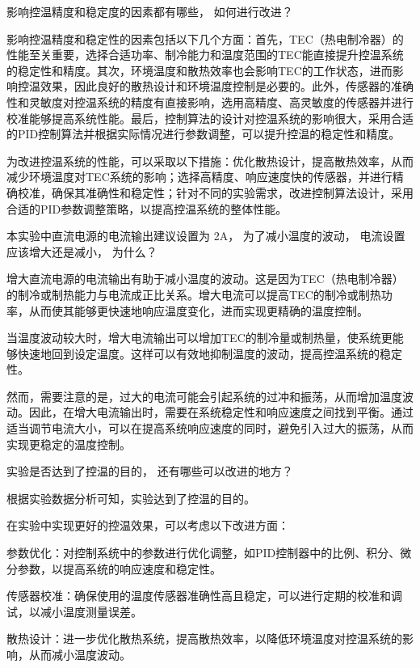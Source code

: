 \documentclass[dvipsnames, svgnames,a4paper,11pt]{article}
\begin{document}
	\begin{question}
		影响控温精度和稳定度的因素都有哪些， 如何进行改进？
	\end{question}
	影响控温精度和稳定性的因素包括以下几个方面：首先，TEC（热电制冷器）的性能至关重要，选择合适功率、制冷能力和温度范围的TEC能直接提升控温系统的稳定性和精度。其次，环境温度和散热效率也会影响TEC的工作状态，进而影响控温效果，因此良好的散热设计和环境温度控制是必要的。此外，传感器的准确性和灵敏度对控温系统的精度有直接影响，选用高精度、高灵敏度的传感器并进行校准能够提高系统性能。最后，控制算法的设计对控温系统的影响很大，采用合适的PID控制算法并根据实际情况进行参数调整，可以提升控温的稳定性和精度。

	为改进控温系统的性能，可以采取以下措施：优化散热设计，提高散热效率，从而减少环境温度对TEC系统的影响；选择高精度、响应速度快的传感器，并进行精确校准，确保其准确性和稳定性；针对不同的实验需求，改进控制算法设计，采用合适的PID参数调整策略，以提高控温系统的整体性能。
	\begin{question}
		本实验中直流电源的电流输出建议设置为 2A， 为了减小温度的波动， 电流设置应该增大还是减小， 为什么？
	\end{question}
	增大直流电源的电流输出有助于减小温度的波动。这是因为TEC（热电制冷器）的制冷或制热能力与电流成正比关系。增大电流可以提高TEC的制冷或制热功率，从而使其能够更快速地响应温度变化，进而实现更精确的温度控制。

当温度波动较大时，增大电流输出可以增加TEC的制冷量或制热量，使系统更能够快速地回到设定温度。这样可以有效地抑制温度的波动，提高控温系统的稳定性。

然而，需要注意的是，过大的电流可能会引起系统的过冲和振荡，从而增加温度波动。因此，在增大电流输出时，需要在系统稳定性和响应速度之间找到平衡。通过适当调节电流大小，可以在提高系统响应速度的同时，避免引入过大的振荡，从而实现更稳定的温度控制。
	\begin{question}
		实验是否达到了控温的目的， 还有哪些可以改进的地方？
	\end{question}
	根据实验数据分析可知，实验达到了控温的目的。

	在实验中实现更好的控温效果，可以考虑以下改进方面：

参数优化：对控制系统中的参数进行优化调整，如PID控制器中的比例、积分、微分参数，以提高系统的响应速度和稳定性。

传感器校准：确保使用的温度传感器准确性高且稳定，可以进行定期的校准和调试，以减小温度测量误差。

散热设计：进一步优化散热系统，提高散热效率，以降低环境温度对控温系统的影响，从而减小温度波动。
\end{document}
